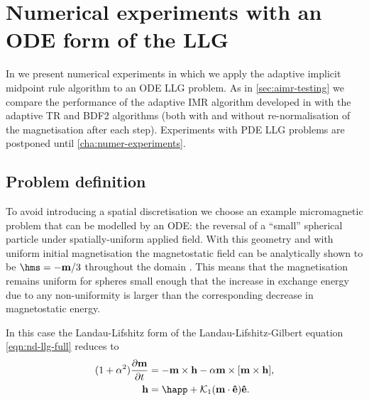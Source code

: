 \section[Numerical experiments with the ODE LLG]{Numerical experiments with an ODE form of the LLG}
\label{sec:imr-ode-llg-numer-exper}


In  we present numerical experiments in which we apply the adaptive implicit midpoint rule algorithm to an ODE LLG problem.
As in \cref{sec:aimr-testing} we compare the performance of the adaptive IMR algorithm developed in  with the adaptive TR and BDF2 algorithms (both with and without re-normalisation of the magnetisation after each step).
Experiments with PDE LLG problems are postponed until \cref{cha:numer-experiments}.

\subsection{Problem definition}
\label{sec:aimr-llg-problem-definition}

To avoid introducing a spatial discretisation we choose an example micromagnetic problem that can be modelled by an ODE: the reversal of a ``small'' spherical particle under spatially-uniform applied field.
With this geometry and with uniform initial magnetisation the magnetostatic field can be analytically shown to be $\hms = -\mv/3$ throughout the domain \cite[112]{Aharoni1996}.
This means that the magnetisation remains uniform for spheres small enough that the increase in exchange energy due to any non-uniformity is larger than the corresponding decrease in magnetostatic energy.

In this case the Landau-Lifshitz form of the Landau-Lifshitz-Gilbert equation \cref{eqn:nd-llg-full} reduces to
\begin{equation}
  \begin{aligned}
    (1 + \dampc^2) \dmdt &= - \mv \times \hv - \dampc \mv \times \bigs{\mv \times \hv}, \\
    \hv &= \happ + \kone (\mv \cdot \ev) \ev.
    \label{eqn:nd-ode-llg}
  \end{aligned}
\end{equation}

